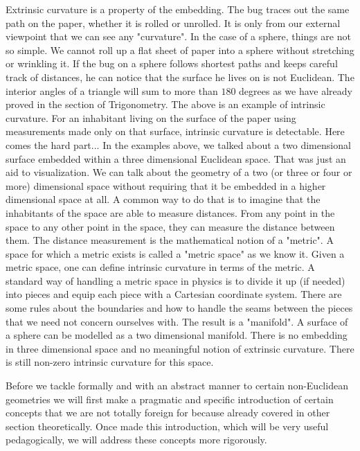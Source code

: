 	 Extrinsic curvature is a property of the embedding. The bug traces out the same path on the paper, whether it is rolled or unrolled. It is only from our external viewpoint that we can see any "curvature". In the case of a sphere, things are not so simple. We cannot roll up a flat sheet of paper into a sphere without stretching or wrinkling it. If the bug on a sphere follows shortest paths and keeps careful track of distances, he can notice that the surface he lives on is not Euclidean. The interior angles of a triangle will sum to more than $180$ degrees as we have already proved in the section of Trigonometry. The above is an example of intrinsic curvature. For an inhabitant living on the surface of the paper using measurements made only on that surface, intrinsic curvature is detectable. Here comes the hard part... In the examples above, we talked about a two dimensional surface embedded within a three dimensional Euclidean space. That was just an aid to visualization. We can talk about the geometry of a two (or three or four or more) dimensional space without requiring that it be embedded in a higher dimensional space at all. A common way to do that is to imagine that the inhabitants of the space are able to measure distances. From any point in the space to any other point in the space, they can measure the distance between them. The distance measurement is the mathematical notion of a "metric". A space for which a metric exists is called a "metric space" as we know it. Given a metric space, one can define intrinsic curvature in terms of the metric. A standard way of handling a metric space in physics is to divide it up (if needed) into pieces and equip each piece with a Cartesian coordinate system. There are some rules about the boundaries and how to handle the seams between the pieces that we need not concern ourselves with. The result is a "manifold". A surface of a sphere can be modelled as a two dimensional manifold. There is no embedding in three dimensional space and no meaningful notion of extrinsic curvature. There is still non-zero intrinsic curvature for this space.
	
	Before we tackle formally and with an abstract manner to certain non-Euclidean geometries we will first make a pragmatic and specific introduction of certain concepts that we are not totally foreign for because already covered in other section theoretically. Once made this introduction, which will be very useful pedagogically, we will address these concepts more rigorously.
	
